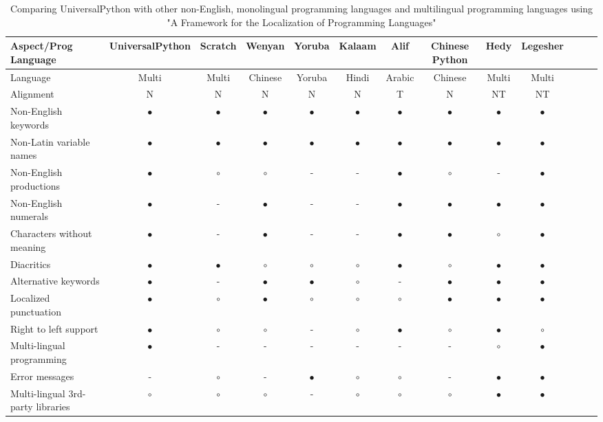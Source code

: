\documentclass[conference]{IEEEtran}
\begin{document}
\begin{table}[t]
  \caption{Comparing UniversalPython with other non-English, monolingual programming languages and multilingual programming languages using "A Framework for the Localization of Programming Languages" \cite{swidan2023framework}}
  \centering
  \begin{tabularx}{\textwidth}{l *{12}{c}}
  \hline
 Aspect/Prog Language & UniversalPython & Scratch & Wenyan & Yoruba & Kalaam & Alif & Chinese Python & Hedy & Legesher \\
  \hline
 Language & Multi & Multi & Chinese & Yoruba & Hindi & Arabic & Chinese & Multi & Multi \\
 Alignment & N & N & N & N & N & T & N & NT & NT \\
 Non-English keywords & $\bullet$ & $\bullet$ & $\bullet$ & $\bullet$ & $\bullet$ & $\bullet$ & $\bullet$ & $\bullet$ & $\bullet$ \\
 Non-Latin variable names & $\bullet$ & $\bullet$ & $\bullet$ & $\bullet$ & $\bullet$ & $\bullet$ & $\bullet$ & $\bullet$ & $\bullet$ \\
 Non-English productions & $\bullet$ & $\circ$ & $\circ$ & - & - & $\bullet$ & $\circ$ & - & $\bullet$ \\
 Non-English numerals & $\bullet$ & - & $\bullet$ & - & - & $\bullet$ & $\bullet$ & $\bullet$ & $\bullet$ \\
 Characters without meaning & $\bullet$ & - & $\bullet$ & - & - & $\bullet$ & $\bullet$ & $\circ$ & $\bullet$ \\
 Diacritics & $\bullet$ & $\bullet$ & $\circ$ & $\circ$ & $\circ$ & $\bullet$ & $\circ$ & $\bullet$ & $\bullet$ \\
 Alternative keywords & $\bullet$ & - & $\bullet$ & $\bullet$ & $\circ$ & - & $\bullet$ & $\bullet$ & $\bullet$ \\
 Localized punctuation & $\bullet$ & $\circ$ & $\bullet$ & $\circ$ & $\circ$ & $\circ$ & $\bullet$ & $\bullet$ & $\bullet$ \\
 Right to left support & $\bullet$ & $\circ$ & $\circ$ & - & $\circ$ & $\bullet$ & $\circ$ & $\bullet$ & $\circ$ \\
 Multi-lingual programming & $\bullet$ & - & - & - & - & - & - & $\circ$ & $\bullet$ \\
 Error messages & - & $\circ$ & - & $\bullet$ & $\circ$ & $\circ$ & - & $\bullet$ & $\bullet$ \\
 Multi-lingual 3rd-party libraries & $\circ$ & $\circ$ & $\circ$ & - & $\circ$ & $\circ$ & $\circ$ & $\bullet$ & $\bullet$ \\
  \hline
  \end{tabularx}
  \end{table}
    
\end{document}
